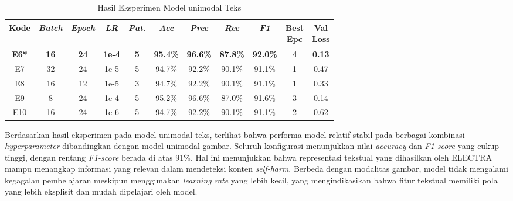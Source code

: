 \begin{table}[H]
    \centering
    \caption{Hasil Eksperimen Model unimodal Teks}
    \label{table:4.teks_eksperimenteks}
    \small
    \setlength{\tabcolsep}{2pt} 
    \renewcommand{\arraystretch}{1.15}
    
    
        \begin{tabular}{ccccccccccc}
            \hline
            \textbf{Kode} & \textbf{\textit{Batch}} & \textbf{\textit{Epoch}} & \textbf{\textit{LR}} & \textbf{\textit{Pat.}} & \textbf{\textit{Acc}} & \textbf{\textit{Prec}} & \textbf{\textit{Rec}} & \textbf{\textit{F1}} & \shortstack{\textbf{Best}\\\textbf{Epc}} & \shortstack{\textbf{Val}\\\textbf{Loss}} \\
            \hline
            \textbf{E6*} & \textbf{16} & \textbf{24} & \textbf{1e-4} & \textbf{5} & \textbf{95.4\%} & \textbf{96.6\%} & \textbf{87.8\%} & \textbf{92.0\%} & \textbf{4} & \textbf{0.13} \\
            E7 & 32 & 24 & 1e-5 & 5 & 94.7\% & 92.2\% & 90.1\% & 91.1\% & 1 & 0.47 \\
            E8 & 16 & 12 & 1e-5 & 3 & 94.7\% & 92.2\% & 90.1\% & 91.1\% & 1 & 0.33 \\
            E9 & 8 & 24 & 1e-4 & 5 & 95.2\% & 96.6\% & 87.0\% & 91.6\% & 3 & 0.14 \\
            E10 & 16 & 24 & 1e-6 & 5 & 94.7\% & 92.2\% & 90.1\% & 91.1\% & 2 & 0.62 \\
            \hline
        \end{tabular}
    
\end{table}


Berdasarkan hasil eksperimen pada model unimodal teks, terlihat bahwa performa model relatif stabil pada berbagai kombinasi \textit{hyperparameter} dibandingkan dengan model unimodal gambar. Seluruh konfigurasi menunjukkan nilai \textit{accuracy} dan \textit{F1-score} yang cukup tinggi, dengan rentang \textit{F1-score} berada di atas 91\%. Hal ini menunjukkan bahwa representasi tekstual yang dihasilkan oleh ELECTRA mampu menangkap informasi yang relevan dalam mendeteksi konten \textit{self-harm}. Berbeda dengan modalitas gambar, model tidak mengalami kegagalan pembelajaran meskipun menggunakan \textit{learning rate} yang lebih kecil, yang mengindikasikan bahwa fitur tekstual memiliki pola yang lebih eksplisit dan mudah dipelajari oleh model.

